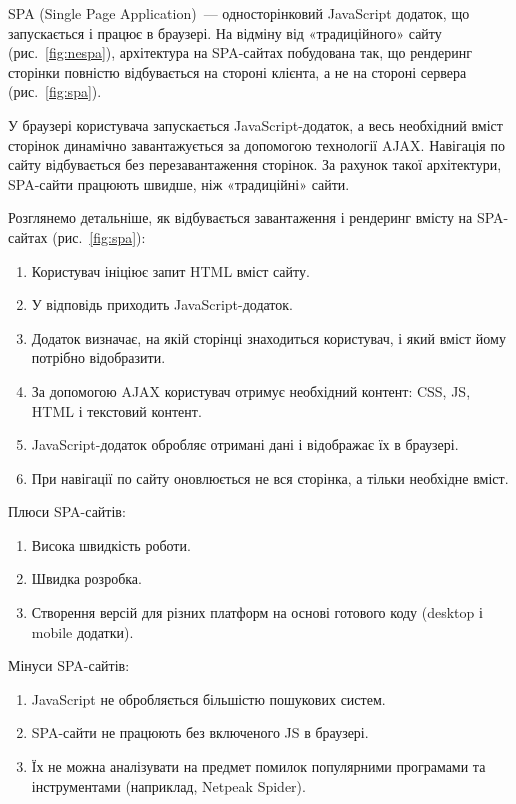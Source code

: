 SPA (Single Page Application)~--- односторінковий JavaScript додаток, що запускається і працює в браузері. На відміну від «традиційного» сайту (рис.~\ref{fig:nespa}), архітектура на SPA-сайтах побудована так, що рендеринг сторінки повністю відбувається на стороні клієнта, а не на стороні сервера (рис.~\ref{fig:spa}).

У браузері користувача запускається JavaScript-додаток, а весь необхідний вміст сторінок динамічно завантажується за допомогою технології AJAX. Навігація по сайту відбувається без перезавантаження сторінок. За рахунок такої архітектури, SPA-сайти працюють швидше, ніж «традиційні» сайти.



Розглянемо детальніше, як відбувається завантаження і рендеринг вмісту на SPA-сайтах (рис.~\ref{fig:spa}):

\begin{enumerate}
  \item Користувач ініціює запит HTML вміст сайту.
  \item У відповідь приходить JavaScript-додаток.
  \item Додаток визначає, на якій сторінці знаходиться користувач, і який вміст йому потрібно відобразити.
  \item За допомогою AJAX користувач отримує необхідний контент: CSS, JS, HTML і текстовий контент.
  \item JavaScript-додаток обробляє отримані дані і відображає їх в браузері.
  \item При навігації по сайту оновлюється не вся сторінка, а тільки необхідне вміст.
\end{enumerate}

Плюси SPA-сайтів:

\begin{enumerate}
  \item Висока швидкість роботи.
  \item Швидка розробка.
  \item Створення версій для різних платформ на основі готового коду (desktop і mobile додатки).
\end{enumerate}

Мінуси SPA-сайтів:

\begin{enumerate}
  \item JavaScript не обробляється більшістю пошукових систем.
  \item SPA-сайти не працюють без включеного JS в браузері.
  \item Їх не можна аналізувати на предмет помилок популярними програмами та інструментами (наприклад, Netpeak Spider).
\end{enumerate}